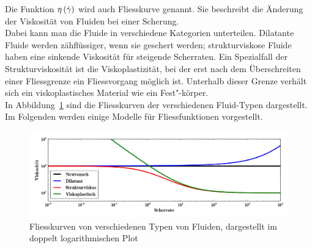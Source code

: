 Die Funktion $\eta\left( \dot\gamma \right)$ wird auch Fliesskurve genannt. Sie beschreibt die Änderung der Viskosität von Fluiden bei einer Scherung.\\
Dabei kann man die Fluide in verschiedene Kategorien unterteilen. Dilatante Fluide werden zähflüssiger, wenn sie geschert werden; strukturviskose Fluide haben eine sinkende Viskosität für steigende Scherraten.
Ein Spezialfall der Strukturviskosität ist die Viskoplastizität, bei der erst nach dem Überschreiten einer Fliessgrenze ein Fliessvorgang möglich ist. Unterhalb dieser Grenze verhält sich ein viskoplastisches Material wie ein Fest"-körper.\\
In Abbildung~\ref{fig:fliessKurven} sind die Fliesskurven der verschiedenen Fluid-Typen dar\-ge\-stellt. Im Folgenden werden einige Modelle für Fliessfunktionen vorgestellt. 
%
%
\begin{figure}
    \centering
    \includegraphics[width=\textwidth]{figures/Fliesskurven.png}
    \caption{Fliesskurven von verschiedenen Typen von Fluiden, dargestellt im doppelt logarithmischen Plot}
    \label{fig:fliessKurven}
\end{figure}
%
